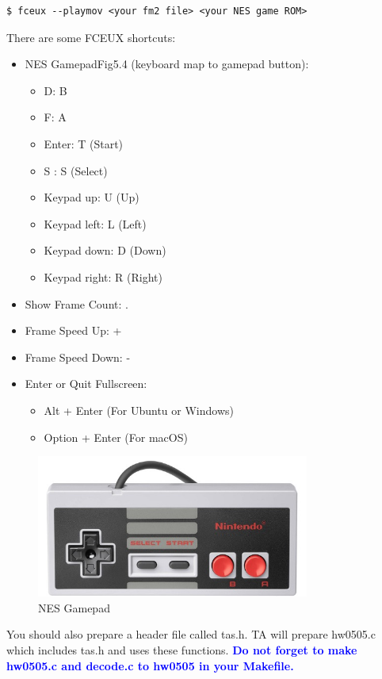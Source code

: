 \documentclass[a4paper,11pt]{article}
\begin{document}
\begin{lstlisting}
$ fceux --playmov <your fm2 file> <your NES game ROM>
\end{lstlisting}

There are some FCEUX shortcuts:

\begin{itemize}
\item 
{
NES Gamepad{{\color{blue}\tiny Fig5.4}}  (keyboard map to gamepad button):
    \begin{itemize}
    \item 
    {
    D: B
    }
    \item 
    {
    F: A
    }
    \item 
    {
    Enter: T (Start)
    }
    \item 
    {
    S : S (Select)
    }
    \item 
    {
    Keypad up: U (Up)
    }
    \item 
    {
    Keypad left: L (Left)
    }
    \item 
    {
    Keypad down: D (Down)
    }
    \item 
    {
    Keypad right: R (Right)
    }
    \end{itemize}
}
\item 
{
Show Frame Count: .
}
\item 
{
Frame Speed Up: +
}
\item 
{
Frame Speed Down: -
}
\item 
{
Enter or Quit Fullscreen: 
    \begin{itemize}
    \item 
    {
         Alt + Enter (For Ubuntu or Windows)
    }
    \item 
    {
         Option + Enter (For macOS)
    }
    \end{itemize}
}
\end{itemize}

\begin{figure}[h]
    \centering
    \includegraphics[width=0.8\textwidth]{assets/NES-gamepad.jpg}
    \caption{NES Gamepad}
\end{figure}

You should also prepare a header file called {\color{red}tas.h}. TA will prepare hw0505.c which includes tas.h and uses these functions. {\textbf{\textcolor{blue}{Do not forget to make hw0505.c and decode.c to hw0505 in your Makefile.}}}
\end{document}

